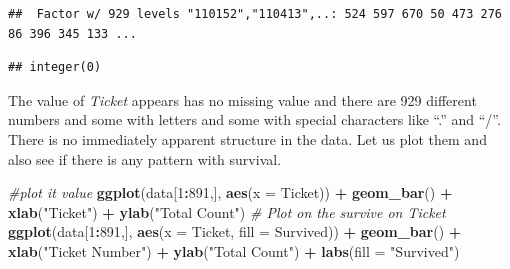 \documentclass[
]{book}
\newenvironment{Shaded}{\begin{snugshade}}{\end{snugshade}}
\newcommand{\CommentTok}[1]{\textcolor[rgb]{0.56,0.35,0.01}{\textit{#1}}}
\newcommand{\DataTypeTok}[1]{\textcolor[rgb]{0.13,0.29,0.53}{#1}}
\newcommand{\DecValTok}[1]{\textcolor[rgb]{0.00,0.00,0.81}{#1}}
\newcommand{\KeywordTok}[1]{\textcolor[rgb]{0.13,0.29,0.53}{\textbf{#1}}}
\newcommand{\NormalTok}[1]{#1}
\newcommand{\OperatorTok}[1]{\textcolor[rgb]{0.81,0.36,0.00}{\textbf{#1}}}
\newcommand{\StringTok}[1]{\textcolor[rgb]{0.31,0.60,0.02}{#1}}
\begin{document}
\begin{Shaded}
\end{Shaded}

\begin{verbatim}
##  Factor w/ 929 levels "110152","110413",..: 524 597 670 50 473 276 86 396 345 133 ...
\end{verbatim}

\begin{Shaded}
\end{Shaded}

\begin{verbatim}
## integer(0)
\end{verbatim}

The value of \emph{Ticket} appears has no missing value and there are 929 different numbers and some with letters and some with special characters like ``.'' and ``/''. There is no immediately apparent structure in the data.
Let us plot them and also see if there is any pattern with survival.

\begin{Shaded}
\begin{Highlighting}[]
\CommentTok{#plot it value }
\KeywordTok{ggplot}\NormalTok{(data[}\DecValTok{1}\OperatorTok{:}\DecValTok{891}\NormalTok{,], }\KeywordTok{aes}\NormalTok{(}\DataTypeTok{x =}\NormalTok{ Ticket)) }\OperatorTok{+}
\StringTok{  }\KeywordTok{geom_bar}\NormalTok{() }\OperatorTok{+}
\StringTok{  }\KeywordTok{xlab}\NormalTok{(}\StringTok{"Ticket"}\NormalTok{) }\OperatorTok{+}
\StringTok{  }\KeywordTok{ylab}\NormalTok{(}\StringTok{"Total Count"}\NormalTok{)}
\CommentTok{# Plot on the survive on Ticket}
\KeywordTok{ggplot}\NormalTok{(data[}\DecValTok{1}\OperatorTok{:}\DecValTok{891}\NormalTok{,], }\KeywordTok{aes}\NormalTok{(}\DataTypeTok{x =}\NormalTok{ Ticket, }\DataTypeTok{fill =}\NormalTok{ Survived)) }\OperatorTok{+}
\StringTok{  }\KeywordTok{geom_bar}\NormalTok{() }\OperatorTok{+}
\StringTok{  }\KeywordTok{xlab}\NormalTok{(}\StringTok{"Ticket Number"}\NormalTok{) }\OperatorTok{+}
\StringTok{  }\KeywordTok{ylab}\NormalTok{(}\StringTok{"Total Count"}\NormalTok{)  }\OperatorTok{+}
\StringTok{  }\KeywordTok{labs}\NormalTok{(}\DataTypeTok{fill =} \StringTok{"Survived"}\NormalTok{)}
\end{Highlighting}
\end{Shaded}
\end{document}
